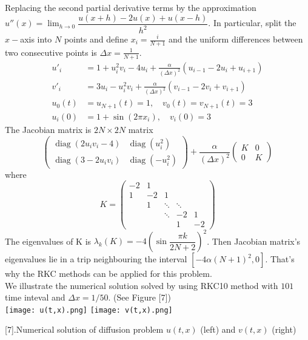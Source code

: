 \documentclass{article}
\DeclareMathOperator{\diag}{diag}
\theoremstyle{theorem}
\theoremstyle{definition}
\begin{document}
Replacing the second partial derivative terms by the approximation $u''(x) =\lim_{h \to 0} \dfrac{u(x+h)-2u(x)+u(x-h)}{h^2}$. In particular, split the $x-$axis into $N$ points and define $x_i = \frac{i}{N+1}$ and the uniform differences between two consecutive points is $\Delta x = \frac{1}{N+1}$.
$$\begin{aligned}u'_i&= 1+u_i^2v_i-4u_i+\frac{\alpha}{(\Delta x)^2} (u_{i-1}-2u_i+u_{i+1}) \\v'_i&= 3u_i-u_i^2v_i+\frac{\alpha}{(\Delta x)^2} (v_{i-1}-2v_i+v_{i+1}) \\
u_0(t)&=u_{N+1}(t)=1,\quad v_0(t)=v_{N+1}(t)=3 \\
u_i(0)&=1+\sin(2\pi x_i), \quad v_i(0)=3 \end{aligned}$$
The Jacobian matrix is $2N \times 2N$ matrix
$$ \begin{pmatrix}
\diag(2u_iv_i-4)  &\diag(u_i^2) \\ 
\diag(3-2u_iv_i) & \diag(-u_i^2)
\end{pmatrix} +\frac{\alpha}{(\Delta x)^2}\begin{pmatrix}
K &0 \\ 
0 & K
\end{pmatrix}$$
where $$K=\begin{pmatrix}
-2 &1  &  &  & \\ 
1& -2 &1  &  & \\ 
&1  &\ddots  & \ddots & \\ 
&  & \ddots &-2  &1 \\ 
&  &  &  1&-2 
\end{pmatrix}$$
The eigenvalues of K is $\lambda_k(K)=-4 \left(\sin \dfrac{\pi k}{2N+2}\right)^2$. Then Jacobian matrix's eigenvalues lie in a trip neighbouring the interval $[-4\alpha (N+1)^2 , 0]$. That's why the RKC methods can be applied for this problem.\\
We illustrate the numerical solution solved by using RKC10 method with $101$ time inteval and $\Delta x =1/50$. (See Figure [7]) \\
	\texttt{[image: u(t,x).png]}
	\texttt{[image: v(t,x).png]}
\begin{center}\figurename[7]{.Numerical solution of diffusion problem $u(t,x)$ (left) and $v(t,x)$ (right)}
\end{center}
\end{document}
